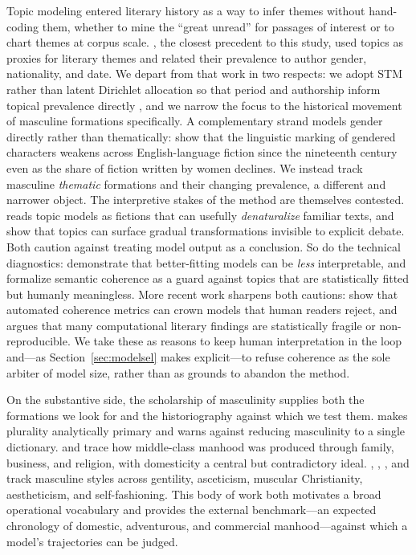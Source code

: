 \documentclass[11pt]{article}
\begin{document}
Topic modeling entered literary history as a way to infer themes without
hand-coding them, whether to mine the ``great unread'' for passages of interest
\citep{tangherlini2013trawling} or to chart themes at corpus scale.
\citet{jockers2013significant}, the closest precedent to this
study, used topics as proxies for literary themes and related their prevalence to
author gender, nationality, and date. We depart from that work in two respects:
we adopt STM rather than latent Dirichlet allocation \citep{blei2003lda} so that
period and authorship inform topical prevalence directly
\citep{roberts2014structural,roberts2019stm}, and we narrow the focus to the
historical movement of masculine formations specifically. A complementary strand
models gender directly rather than thematically: \citet{underwood2018transformation}
show that the linguistic marking of gendered characters weakens across
English-language fiction since the nineteenth century even as the share of
fiction written by women declines. We instead track masculine \emph{thematic}
formations and their changing prevalence, a different and narrower object. The
interpretive stakes of the method are themselves contested. \citet{buurma2015fictionality} reads topic
models as fictions that can usefully \emph{denaturalize} familiar texts, and
\citet{goldstone2014quiet} show that topics can surface gradual transformations
invisible to explicit debate. Both caution against treating model output as a
conclusion. So do the technical diagnostics: \citet{chang2009reading} demonstrate
that better-fitting models can be \emph{less} interpretable, and
\citet{mimno2011optimizing} formalize semantic coherence as a guard against
topics that are statistically fitted but humanly meaningless. More recent work
sharpens both cautions: \citet{hoyle2021automated} show that automated coherence
metrics can crown models that human readers reject, and \citet{da2019computational}
argues that many computational literary findings are statistically fragile or
non-reproducible. We take these as reasons to keep human interpretation in the
loop and---as Section~\ref{sec:modelsel} makes explicit---to refuse coherence as
the sole arbiter of model size, rather than as grounds to abandon the method.

On the substantive side, the scholarship of masculinity supplies both the
formations we look for and the historiography against which we test them.
\citet{connell1995masculinities} makes plurality analytically primary and warns
against reducing masculinity to a single dictionary. \citet{davidoff1987family}
and \citet{tosh1999mans} trace how middle-class manhood was produced through
family, business, and religion, with domesticity a central but contradictory
ideal. \citet{sussman1995victorian}, \citet{adams1995dandies},
\citet{solinger2012becoming}, and \citet{mallett2015victorian} track masculine
styles across gentility, asceticism, muscular Christianity, aestheticism, and
self-fashioning. This body of work both motivates a broad operational vocabulary
and provides the external benchmark---an expected chronology of domestic,
adventurous, and commercial manhood---against which a model's trajectories can be
judged.
\end{document}
